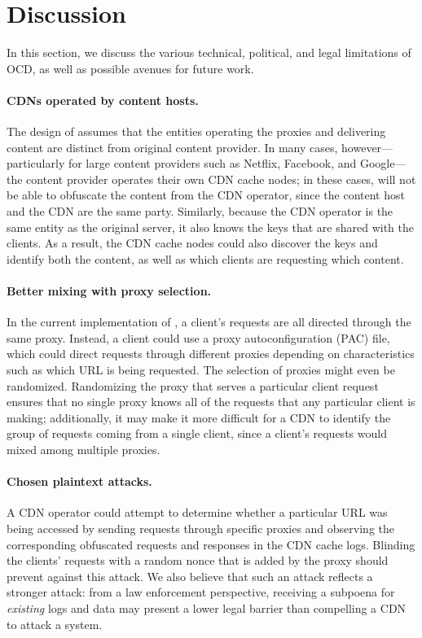 \section{Discussion}
\label{sec:discussion}

In this section, we discuss the various technical, political, and legal limitations
of OCD, as well as possible avenues for future work. 

\paragraph{CDNs operated by content hosts.} The design of \system{}
assumes that the entities operating the proxies and delivering content are
distinct from original content provider. In many cases, however---particularly
for large content providers such as Netflix, Facebook, and Google---the
content provider operates their own CDN cache nodes; in these cases, \system{} will
not be able to obfuscate the content from the CDN operator, since the content host
and the CDN are the same party.  Similarly, because the CDN operator is the same
entity as the original server, it also knows the keys that are shared with the clients.
As a result, the CDN cache nodes could also discover the keys and identify both
the content, as well as which clients are requesting which content.

\paragraph{Better mixing with proxy selection.} In the current implementation of
\system{}, a client's requests are all directed through the same \system{} proxy.
Instead, a client could use a proxy autoconfiguration (PAC) file, which could direct
requests through different proxies depending on characteristics such as which URL
is being requested. The selection of proxies might even be randomized.  Randomizing
the proxy that serves a particular client request ensures that no single proxy knows
all of the requests that any particular client is making; additionally, it may make
it more difficult for a CDN to identify the group of requests coming from a single
client, since a client's requests would mixed among multiple proxies. 

\paragraph{Chosen plaintext attacks.} A CDN operator could attempt to
determine whether a particular URL was being accessed by sending requests
through specific \system{} proxies and observing the corresponding obfuscated
requests and responses in the CDN cache logs. Blinding the clients' requests
with a random nonce that is added by the proxy should prevent against this
attack. We also believe that such an attack reflects a stronger attack: from a
law enforcement perspective, receiving a subpoena for {\em existing} logs and
data may present a lower legal barrier than compelling a CDN to attack a
system.

